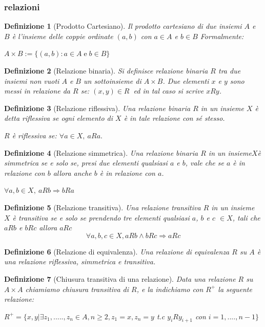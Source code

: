 \documentclass[a4paper]{article}
\newtheorem*{definition}{Definizione}
\begin{document}
\subsubsection{relazioni}
\begin{definition}[Prodotto Cartesiano]Il prodotto cartesiano di due insiemi $A$ e $B$ è l'insieme delle coppie ordinate $(a,b)$ con $a \in A$ e $b \in B$ Formalmente:\begin{center}
$A\times B:=\{(a,b):a\in A\;{\mathrm  {e}}\;b\in B\}$\end{center}
\end{definition}
\begin{definition}[Relazione binaria]
Si definisce relazione binaria $R$ tra due insiemi non vuoti $A$ e $B$ un sottoinsieme di $ A \times B$. Due elementi $x$ e $y$ sono messi in relazione da $R$ se: 
$(x,y)\in R\ $ ed in tal caso si scrive $xRy$.
\end{definition}
\begin{definition}[Relazione riflessiva]
Una relazione binaria $R$ in un insieme $X$ è detta riflessiva se ogni elemento di $X$ è in tale relazione con sé stesso.
\begin{center} $R$ è riflessiva se: $ \forall a\in X,\ aRa.$ \end{center}
\end{definition}
\begin{definition}[Relazione simmetrica]Una relazione binaria $R$ in un insieme$ X $è simmetrica se e solo se, presi due elementi qualsiasi $a$ e $b$, vale che se $a$ è in relazione con $b$ allora anche $b$ è in relazione con $a$.\\
\begin{center}$\forall a,b\in X,\ aRb\Rightarrow bRa$\end{center}
\end{definition}
\begin{definition}[Relazione transitiva]Una relazione transitiva $R$ in un insieme $X$ è transitiva se e solo se prendendo tre elementi qualsiasi $a$, $b$ e $c$ $ \in X$, tali che $aRb$ e $bRc$ allora $aRc$
	$$\forall a,b,c \in X,aRb \wedge bRc \Rightarrow aRc$$
\end{definition}
\begin{definition}[Relazione di equivalenza]Una relazione di equivalenza $R$ su $A$ è una relazione riflessiva, simmetrica e transitiva.
\end{definition}
\begin{definition}[Chiusura transitiva di una relazione]Data una relazione $R$ su $A\times A$ chiamiamo chiusura transitiva di $R$, e la indichiamo con $R^{+}$ la seguente relazione:
\begin{center}$ R^{+} = \{ x, y | \exists z_1,.....,z_n \in A, n \geq 2, z_1 = x, z_n = y$ t.c $ y_iRy_{i+1}$ con $ i=1,....,n-1 \} $ \end{center}
\end{definition}
\end{document}
